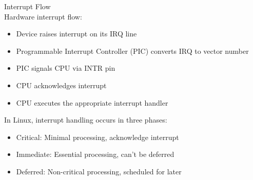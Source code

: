 \begin{definition}{Interrupt Flow}\\
    Hardware interrupt flow:
    \begin{itemize}
        \item Device raises interrupt on its IRQ line
        \item Programmable Interrupt Controller (PIC) converts IRQ to vector number
        \item PIC signals CPU via INTR pin
        \item CPU acknowledges interrupt
        \item CPU executes the appropriate interrupt handler
    \end{itemize}
        In Linux, interrupt handling occurs in three phases:
            \begin{itemize}
                \item Critical: Minimal processing, acknowledge interrupt
                \item Immediate: Essential processing, can't be deferred
                \item Deferred: Non-critical processing, scheduled for later
            \end{itemize}
\end{definition}

